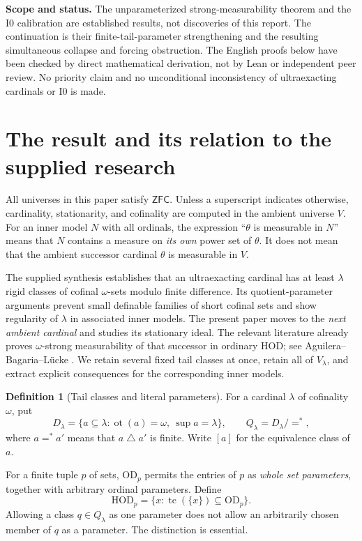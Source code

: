 \documentclass[11pt,letterpaper]{article}
\theoremstyle{definition}
\newtheorem{definition}{Definition}[section]
\numberwithin{equation}{section}
\newcommand{\ZFC}{\mathsf{ZFC}}
\newcommand{\HOD}{\mathrm{HOD}}
\newcommand{\OD}{\mathrm{OD}}
\newcommand{\ot}{\operatorname{ot}}
\newcommand{\Izero}{\mathrm{I0}}
\newcommand{\tc}{\operatorname{tc}}
\begin{document}
\textbf{Scope and status.} The unparameterized strong-measurability theorem and the $\Izero$ calibration are established results, not discoveries of this report. The continuation is their finite-tail-parameter strengthening and the resulting simultaneous collapse and forcing obstruction. The English proofs below have been checked by direct mathematical derivation, not by Lean or independent peer review. No priority claim and no unconditional inconsistency of ultraexacting cardinals or $\Izero$ is made.

\newpage
\tableofcontents

\newpage
\section{The result and its relation to the supplied research}\label{sec:main}

All universes in this paper satisfy $\ZFC$. Unless a superscript indicates otherwise, cardinality, stationarity, and cofinality are computed in the ambient universe $V$. For an inner model $N$ with all ordinals, the expression ``$\theta$ is measurable in $N$'' means that $N$ contains a measure on \emph{its own} power set of $\theta$. It does not mean that the ambient successor cardinal $\theta$ is measurable in $V$.

The supplied synthesis establishes that an ultraexacting cardinal has at least $\lambda$ rigid classes of cofinal $\omega$-sets modulo finite difference. Its quotient-parameter arguments prevent small definable families of short cofinal sets and show regularity of $\lambda$ in associated inner models. The present paper moves to the \emph{next ambient cardinal} and studies its stationary ideal. The relevant literature already proves $\omega$-strong measurability of that successor in ordinary $\HOD$; see Aguilera--Bagaria--L\"ucke \cite[Theorem~3.14 and Corollary~3.15]{abl}. We retain several fixed tail classes at once, retain all of $V_\lambda$, and extract explicit consequences for the corresponding inner models.

\begin{definition}[Tail classes and literal parameters]\label{def:tails}
For a cardinal $\lambda$ of cofinality $\omega$, put
\[
D_\lambda=\{a\subseteq\lambda:\ot(a)=\omega,\ \sup a=\lambda\},
\qquad
Q_\lambda=D_\lambda/{=^*},
\]
where $a=^*a'$ means that $a\mathbin\triangle a'$ is finite. Write $[a]$ for the equivalence class of $a$.

For a finite tuple $p$ of sets, $\OD_p$ permits the entries of $p$ as \emph{whole set parameters}, together with arbitrary ordinal parameters. Define
\[
\HOD_p=\{x:\tc(\{x\})\subseteq\OD_p\}.
\]
Allowing a class $q\in Q_\lambda$ as one parameter does not allow an arbitrarily chosen member of $q$ as a parameter. The distinction is essential.
\end{definition}
\end{document}
